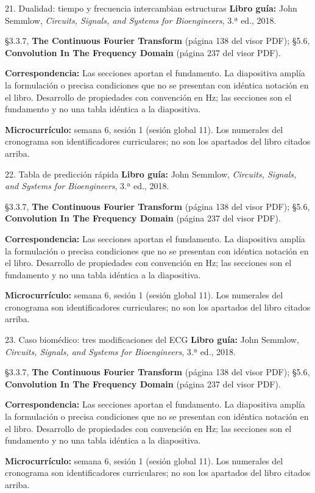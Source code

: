 \documentclass[
  10pt,
  ignorenonframetext,
  aspectratio=169,
  spanish,
]{beamer}
\begin{document}
\begin{frame}{21. Dualidad: tiempo y frecuencia intercambian
estructuras}
\label{dualidad-tiempo-y-frecuencia-intercambian-estructuras}
\textbf{Libro guía:} John Semmlow, \emph{Circuits, Signals, and Systems
for Bioengineers}, 3.ª ed., 2018.

§3.3.7, \textbf{The Continuous Fourier Transform} (página 138 del visor
PDF); §5.6, \textbf{Convolution In The Frequency Domain} (página 237 del
visor PDF).

\textbf{Correspondencia:} Las secciones aportan el fundamento. La
diapositiva amplía la formulación o precisa condiciones que no se
presentan con idéntica notación en el libro. Desarrollo de propiedades
con convención en Hz; las secciones son el fundamento y no una tabla
idéntica a la diapositiva.

\textbf{Microcurrículo:} semana 6, sesión 1 (sesión global 11). Los
numerales del cronograma son identificadores curriculares; no son los
apartados del libro citados arriba.
\end{frame}

\begin{frame}{22. Tabla de predicción rápida}
\label{tabla-de-predicciuxf3n-ruxe1pida}
\textbf{Libro guía:} John Semmlow, \emph{Circuits, Signals, and Systems
for Bioengineers}, 3.ª ed., 2018.

§3.3.7, \textbf{The Continuous Fourier Transform} (página 138 del visor
PDF); §5.6, \textbf{Convolution In The Frequency Domain} (página 237 del
visor PDF).

\textbf{Correspondencia:} Las secciones aportan el fundamento. La
diapositiva amplía la formulación o precisa condiciones que no se
presentan con idéntica notación en el libro. Desarrollo de propiedades
con convención en Hz; las secciones son el fundamento y no una tabla
idéntica a la diapositiva.

\textbf{Microcurrículo:} semana 6, sesión 1 (sesión global 11). Los
numerales del cronograma son identificadores curriculares; no son los
apartados del libro citados arriba.
\end{frame}

\begin{frame}{23. Caso biomédico: tres modificaciones del ECG}
\label{caso-biomuxe9dico-tres-modificaciones-del-ecg}
\textbf{Libro guía:} John Semmlow, \emph{Circuits, Signals, and Systems
for Bioengineers}, 3.ª ed., 2018.

§3.3.7, \textbf{The Continuous Fourier Transform} (página 138 del visor
PDF); §5.6, \textbf{Convolution In The Frequency Domain} (página 237 del
visor PDF).

\textbf{Correspondencia:} Las secciones aportan el fundamento. La
diapositiva amplía la formulación o precisa condiciones que no se
presentan con idéntica notación en el libro. Desarrollo de propiedades
con convención en Hz; las secciones son el fundamento y no una tabla
idéntica a la diapositiva.

\textbf{Microcurrículo:} semana 6, sesión 1 (sesión global 11). Los
numerales del cronograma son identificadores curriculares; no son los
apartados del libro citados arriba.
\end{frame}
\end{document}

